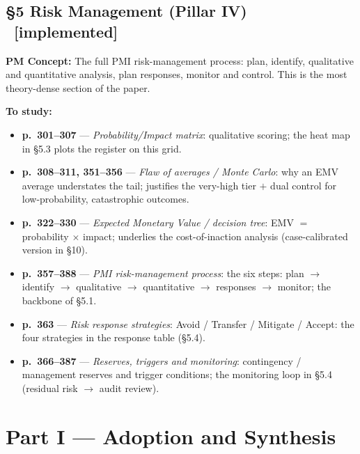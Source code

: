 \documentclass[12pt,a4paper]{article}
\newcommand{\statusdone}{\textcolor{donegreen}{\small\textbf{[implemented]}}}
\newcommand{\slide}[3]{\item \textbf{p.~#1} --- \textit{#2}: #3}
\newcommand{\concetto}[1]{\textbf{PM Concept:} #1\par\vspace{2pt}}
\begin{document}
\subsection{\S5 Risk Management (Pillar IV) \ \statusdone}
\concetto{The full PMI risk-management process: plan, identify, qualitative and quantitative analysis, plan responses, monitor and control. This is the most theory-dense section of the paper.}
\textbf{To study:}
\begin{itemize}
  \slide{301--307}{Probability/Impact matrix}{qualitative scoring; the heat map in \S5.3 plots the register on this grid.}
  \slide{308--311, 351--356}{Flaw of averages / Monte Carlo}{why an EMV average understates the tail; justifies the very-high tier $+$ dual control for low-probability, catastrophic outcomes.}
  \slide{322--330}{Expected Monetary Value / decision tree}{EMV $=$ probability $\times$ impact; underlies the cost-of-inaction analysis (case-calibrated version in \S10).}
  \slide{357--388}{PMI risk-management process}{the six steps: plan $\to$ identify $\to$ qualitative $\to$ quantitative $\to$ responses $\to$ monitor; the backbone of \S5.1.}
  \slide{363}{Risk response strategies}{Avoid / Transfer / Mitigate / Accept: the four strategies in the response table (\S5.4).}
  \slide{366--387}{Reserves, triggers and monitoring}{contingency / management reserves and trigger conditions; the monitoring loop in \S5.4 (residual risk $\to$ audit review).}
\end{itemize}

\section{Part I --- Adoption and Synthesis}

\end{document}

